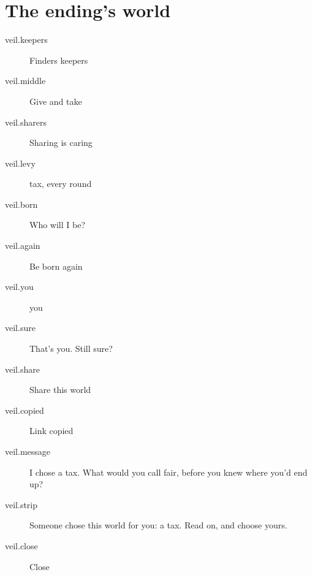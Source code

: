 \section{The ending's world}


\begin{description}
  \item[veil.keepers] Finders keepers
  \item[veil.middle] Give and take
  \item[veil.sharers] Sharing is caring
  \item[veil.levy] tax, every round
  \item[veil.born] Who will I be?
  \item[veil.again] Be born again
  \item[veil.you] you
  \item[veil.sure] That's you. Still sure?
  \item[veil.share] Share this world
  \item[veil.copied] Link copied
  \item[veil.message] I chose a  tax. What would you call fair, before you knew where you'd end up?
  \item[veil.strip] Someone chose this world for you: a  tax. Read on, and choose yours.
  \item[veil.close] Close
\end{description}
